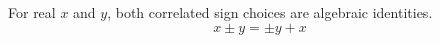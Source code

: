 \documentclass{article}
\begin{document}
For real $x$ and $y$, both correlated sign choices are algebraic identities.
\begin{equation}
  x \pm y = \pm y + x
\end{equation}
\end{document}
